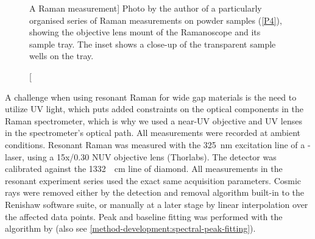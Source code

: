 \documentclass[webedition,openright,titles,swedish,english]{LuaUUThesis}\usepackage[]{graphicx}\usepackage[]{xcolor}
\begin{document}
\begin{figure}[tbp]
\centering
{}
\caption%
[A Raman measurement]{%
   Photo by the author of a particularly organised series of Raman measurements on \zincox{}
   powder samples (\cref{P4}), showing the objective lens mount of the Ramanoscope and its sample tray.
   The inset shows a close-up of the transparent sample wells on the tray.
}
\label{fig:0403-raman-setup}
\end{figure}

A challenge when using resonant Raman for wide gap materials
is the need to utilize \gls{UV} light, which puts added constraints on the
optical components in the Raman spectrometer, which is why
we used a near-UV objective and \gls{UV} lenses in the spectrometer's
optical path. All measurements were recorded at ambient conditions.
Resonant Raman was measured with the \qty{325}{\nm} excitation line of a - laser,
using a 15x/0.30 NUV objective lens (Thorlabs).
The detector was calibrated against the \qty{1332}{\per\cm} line of diamond.
All measurements in the resonant experiment series used the exact same acquisition
parameters.
Cosmic rays were removed either by the detection and removal algorithm
built-in to the Renishaw software suite, or manually at a later stage by
linear interpolation over the affected data points.
Peak and baseline fitting was performed with the algorithm by \textcite{Davies2008}
(also see \cref{method-development:spectral-peak-fitting}).
\end{document}
